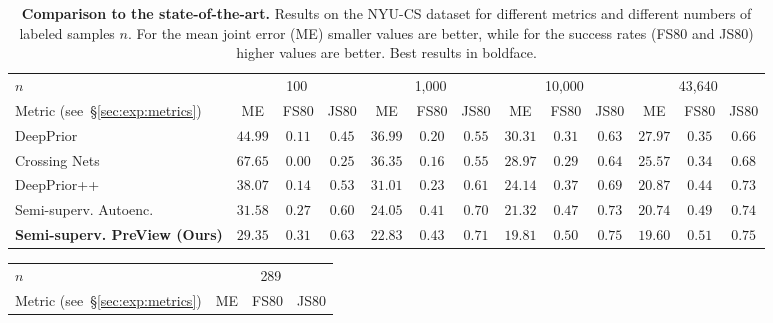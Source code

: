 \documentclass[10pt,twocolumn,letterpaper]{article}
\begin{document}
\begin{table*}[t]
\small
\setlength{\tabcolsep}{0.59em}
\begin{center}
\begin{tabular}{l c c c c c c c c c c c c} 
\toprule
$n$ & \multicolumn{3}{c}{100} & \multicolumn{3}{c}{1,000} & \multicolumn{3}{c}{10,000} & \multicolumn{3}{c}{43,640} \\ 
\cmidrule(rl){2-4} \cmidrule(rl){5-7} \cmidrule(rl){8-10} \cmidrule(rl){11-13}
Metric (see~\S\ref{sec:exp:metrics}) & ME & FS80 & JS80 & ME & FS80 & JS80 & ME & FS80 & JS80 & ME & FS80 & JS80 \\ 
\midrule
DeepPrior~\cite{Oberweger2015cvww_deepprior} & $44.99$ & $0.11$ & $0.45$ & $36.99$ & $0.20$ & $0.55$ & $30.31$ & $0.31$ & $0.63$ & $27.97$ & $0.35$ & $0.66$ \\ 
Crossing Nets~\cite{Wan2017cvpr_crossingnets} & $67.65$ & $0.00$ & $0.25$ & $36.35$ & $0.16$ & $0.55$ & $28.97$ & $0.29$ & $0.64$ & $25.57$ & $0.34$ & $0.68$ \\ 
DeepPrior++~\cite{Oberweger2017iccvw_deeppriorpp} & $38.07$ & $0.14$ & $0.53$ & $31.01$ & $0.23$ & $0.61$ & $24.14$ & $0.37$ & $0.69$ & $20.87$ & $0.44$ & $0.73$ \\ 
\midrule
Semi-superv. Autoenc. & $31.58$ & $0.27$ & $0.60$ & $24.05$ & $0.41$ & $0.70$ & $21.32$ & $0.47$ & $0.73$ & $20.74$ & $0.49$ & $0.74$ \\ 
\textbf{Semi-superv. PreView (Ours)} & $\mathbf{29.35}$ & $\mathbf{0.31}$ & $\mathbf{0.63}$ & $\mathbf{22.83}$ & $\mathbf{0.43}$ & $\mathbf{0.71}$ & $\mathbf{19.81}$ & $\mathbf{0.50}$ & $\mathbf{0.75}$ & $\mathbf{19.60}$ & $\mathbf{0.51}$ & $\mathbf{0.75}$ \\ 
\bottomrule
\end{tabular}
\end{center}
\caption{\textbf{Comparison to the state-of-the-art.}
  Results on the NYU-CS dataset for different metrics and 
  different numbers of labeled samples $n$.
  For the mean joint error (ME) smaller values are better, while for the 
  success rates (FS80 and JS80) higher values are better. 
  Best results in boldface.
  }
\label{tab:exp:sota}
\end{table*}\begin{table}[t]
\setlength{\tabcolsep}{0.57em}
\begin{center}
\begin{tabular}{l c c c}
\toprule 
$n$ & \multicolumn{3}{c}{289} \\ 
\cmidrule(rl){2-4}
Metric (see~\S\ref{sec:exp:metrics}) & ME & FS80 & JS80 \\ 

\end{tabular}
\end{center}
\end{table}
\end{document}
